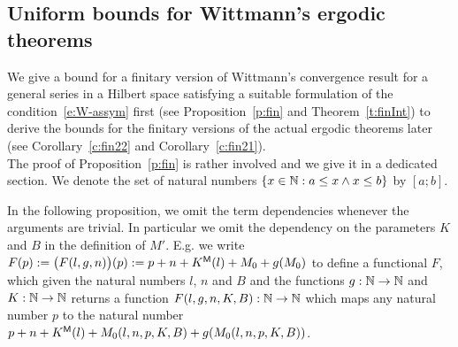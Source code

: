 \subsection{Uniform bounds for Wittmann's ergodic theorems}\label{s:main}

We give a bound for a finitary version of Wittmann's convergence result for
a general series in a Hilbert space satisfying a suitable formulation
of the condition~\eqref{e:W-assym} first 
(see Proposition~\ref{p:fin} and Theorem~\ref{t:finInt}) to derive the bounds
for the finitary versions of the actual ergodic theorems later
(see Corollary~\ref{c:fin22} and Corollary~\ref{c:fin21}).\\
The proof of Proposition~\ref{p:fin} is rather involved and we give it in a dedicated section. We denote the set of natural numbers $\{x\in\mathbb{N} : a\leq x\wedge x\leq b\}$ by $[a;b]$.
\begin{rmk}
In the following proposition, we omit the term dependencies whenever the arguments are trivial. In particular
we omit the dependency on the parameters $K$ and $B$ in the definition of $M'$. E.g. we write $F(p):=\big(F(l,g,n)\big)(p):=p+n+K\protect{^{\textsf{\upshape M}}}(l)+M_0+g(M_0)$
to define a functional $F$, which given the natural numbers $l$, $n$ and $B$ and the
functions $g:\mathbb{N}\to\mathbb{N}$ and $K:\mathbb{N}\to\mathbb{N}$ returns a function $F(l,g,n,K,B):\mathbb{N}\to\mathbb{N}$ which maps any natural number $p$ to the natural number
 $p+n+K\protect{^{\textsf{\upshape M}}}(l)+M_0(l,n,p,K,B)+g(M_0(l,n,p,K,B))$. 
\end{rmk}
